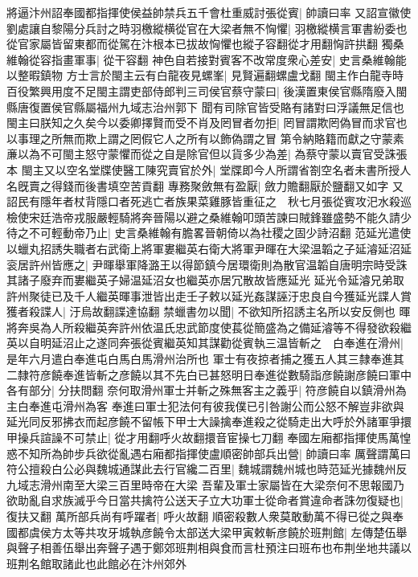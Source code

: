 將逼汴州詔奉國都指揮使侯益帥禁兵五千會杜重威討張從賓|{
	帥讀曰率}
又詔宣徽使劉處讓自黎陽分兵討之時羽檄縱横從官在大梁者無不恟懼|{
	羽檄縱横言軍書紛委也從官家屬皆留東都而從駕在汴根本已拔故恟懼也縱子容翻從才用翻恟許拱翻}
獨桑維翰從容指畫軍事|{
	從干容翻}
神色自若接對賓客不改常度衆心差安|{
	史言桑維翰能以整暇鎮物}
方士言於閩主云有白龍夜見螺峯|{
	見賢遍翻螺盧戈翻}
閩主作白龍寺時百役繁興用度不足閩主謂吏部侍郎判三司侯官蔡守蒙曰|{
	後漢置東侯官縣隋廢入閩縣唐復置侯官縣屬福州九域志治州郭下}
聞有司除官皆受賂有諸對曰浮議無足信也閩主曰朕知之久矣今以委卿擇賢而受不肖及罔冒者勿拒|{
	罔冒謂欺罔偽冒而求官也以事理之所無而欺上謂之罔假它人之所有以飾偽謂之冒}
第令納賂籍而獻之守蒙素亷以為不可閩主怒守蒙懼而從之自是除官但以貨多少為差|{
	為蔡守蒙以賣官受誅張本}
閩主又以空名堂牒使醫工陳究賣官於外|{
	堂牒即今人所謂省劄空名者未書所授人名旣賣之得錢而後書填空苦貢翻}
專務聚斂無有盈厭|{
	斂力贍翻厭於鹽翻又如字}
又詔民有隱年者杖背隱口者死逃亡者族果菜雞豚皆重征之　秋七月張從賓攻汜水殺巡檢使宋廷浩帝戎服嚴輕騎將奔晉陽以避之桑維翰叩頭苦諫曰賊鋒雖盛勢不能久請少待之不可輕動帝乃止|{
	史言桑維翰有膽畧晉朝倚以為社稷之固少詩沼翻}
范延光遣使以蠟丸招誘失職者右武衛上將軍婁繼英右衛大將軍尹暉在大梁温韜之子延濬延沼延衮居許州皆應之|{
	尹暉舉軍降潞王以得節鎮今居環衛則為散官温韜自唐明宗時受誅其諸子廢弃而婁繼英子婦温延沼女也繼英亦居冗散故皆應延光}
延光令延濬兄弟取許州聚徒已及千人繼英暉事泄皆出走壬子敕以延光姦謀誣汙忠良自今獲延光諜人賞獲者殺諜人|{
	汙烏故翻諜達協翻}
禁蠟書勿以聞|{
	不欲知所招誘主名所以安反側也}
暉將奔吳為人所殺繼英奔許州依温氏忠武節度使萇從簡盛為之備延濬等不得發欲殺繼英以自明延沼止之遂同奔張從賓繼英知其謀勸從賓執三温皆斬之　白奉進在滑州|{
	是年六月遣白奉進屯白馬白馬滑州治所也}
軍士有夜掠者捕之獲五人其三隸奉進其二隸符彦饒奉進皆斬之彦饒以其不先白已甚怒明日奉進從數騎詣彦饒謝彦饒曰軍中各有部分|{
	分扶問翻}
奈何取滑州軍士并斬之殊無客主之義乎|{
	符彦饒自以鎮滑州為主白奉進屯滑州為客}
奉進曰軍士犯法何有彼我僕已引咎謝公而公怒不解豈非欲與延光同反邪拂衣而起彦饒不留帳下甲士大譟擒奉進殺之從騎走出大呼於外諸軍爭擐甲操兵諠譟不可禁止|{
	從才用翻呼火故翻擐音宦操七刀翻}
奉國左廂都指揮使馬萬惶惑不知所為帥步兵欲從亂遇右廂都指揮使盧順密帥部兵出營|{
	帥讀曰率}
厲聲謂萬曰符公擅殺白公必與魏城通謀此去行官纔二百里|{
	魏城謂魏州城也時范延光據魏州反九域志滑州南至大梁三百里時帝在大梁}
吾輩及軍士家屬皆在大梁奈何不思報國乃欲助亂自求族滅乎今日當共擒符公送天子立大功軍士從命者賞違命者誅勿復疑也|{
	復扶又翻}
萬所部兵尚有呼躍者|{
	呼火故翻}
順密殺數人衆莫敢動萬不得已從之與奉國都虞侯方太等共攻牙城執彦饒令太部送大梁甲寅敕斬彦饒於班荆館|{
	左傳楚伍舉與聲子相善伍舉出奔聲子遇于鄭郊班荆相與食而言杜預注曰班布也布荆坐地共議以班荆名館取諸此也此館必在汴州郊外}
